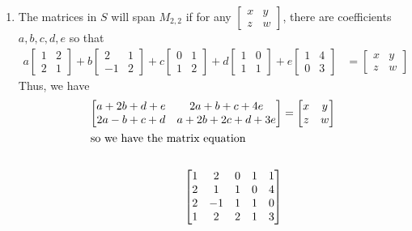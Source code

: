 \begin{enumerate}
\item
The matrices in $S$ will span $M_{2,2}$ if for any $\begin{bmatrix} x& y\\z& w\end{bmatrix}$, there are coefficients $a, b, c, d, e$ so that
%
\begin{align*}
a\begin{bmatrix} 1 & 2\\ 2 & 1 \end{bmatrix} +
b\begin{bmatrix} 2 & 1\\-1 & 2 \end{bmatrix} +
c\begin{bmatrix} 0 & 1 \\ 1 & 2\end{bmatrix} +
d\begin{bmatrix} 1 & 0 \\ 1 & 1\end{bmatrix} +
e\begin{bmatrix} 1 & 4 \\ 0 & 3 \end{bmatrix}
&=
\begin{bmatrix} x & y \\ z & w \end{bmatrix}
\end{align*}
%
Thus, we have
%
\begin{align*}
\begin{bmatrix}
a + 2b + d + e & 2a + b + c + 4e\\
2a - b + c + d& a + 2b + 2c + d + 3e
\end{bmatrix}
&=
\begin{bmatrix}
x & y \\
 z & w
\end{bmatrix}\\
\intertext{so we have  the matrix equation}\\
\begin{bmatrix}
1 & 2 & 0 & 1 & 1 \\
2 & 1 & 1 & 0 & 4\\
2 & -1 & 1 & 1 & 0\\
1 & 2 & 2 & 1 & 3
\end{bmatrix}

\end{align*}
\end{enumerate}

